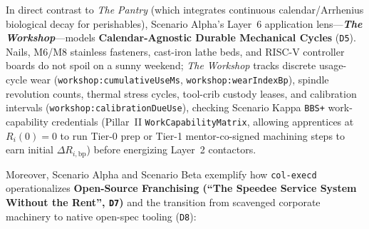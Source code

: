 In direct contrast to \emph{The Pantry} (which integrates continuous calendar/Arrhenius biological
decay for perishables), Scenario Alpha's Layer~6 application lens---\emph{\textbf{The Workshop}}---models
\textbf{Calendar-Agnostic Durable Mechanical Cycles} (\texttt{D5}). Nails, M6/M8 stainless fasteners,
cast-iron lathe beds, and RISC-V controller boards do not spoil on a sunny weekend; \emph{The
Workshop} tracks discrete usage-cycle wear (\texttt{workshop:cumulativeUseMs},
\texttt{workshop:wearIndexBp}), spindle revolution counts, thermal stress cycles, tool-crib custody
leases, and calibration intervals (\texttt{workshop:calibrationDueUse}), checking Scenario Kappa
\texttt{BBS+} work-capability credentials (Pillar~II \texttt{WorkCapabilityMatrix}, allowing
apprentices at $R_i(0)=0$ to run Tier-0 prep or Tier-1 mentor-co-signed machining steps to earn
initial $\Delta R_{i,\mathrm{bp}}$) before energizing Layer~2 contactors.

Moreover, Scenario Alpha and Scenario Beta exemplify how \texttt{col-execd} operationalizes
\textbf{Open-Source Franchising (``The Speedee Service System Without the Rent'', \texttt{D7})} and
the transition from scavenged corporate machinery to native open-spec tooling (\texttt{D8}):

